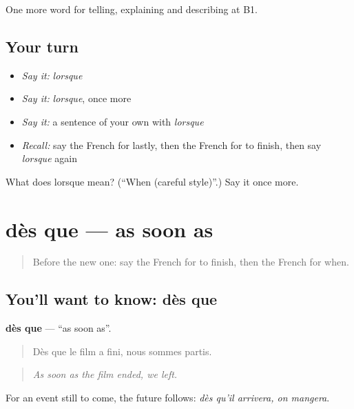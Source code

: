 \begin{grammarlens}[title={What you've built}]
One more word for telling, explaining and describing at B1.
\end{grammarlens}

\subsection*{Your turn}
\begin{itemize}
\raggedright
  \item \emph{Say it:} \emph{lorsque}
  \item \emph{Say it:} \emph{lorsque}, once more
  \item \emph{Say it:} a sentence of your own with \emph{lorsque}
  \item \emph{Recall:} say the French for lastly, then the French for to finish, then say \emph{lorsque} again
\end{itemize}

\begin{tcolorbox}[breakable,colback=teal!4,colframe=teal!35!black,title={Before you move on}]
What does lorsque mean? (\textquotedblleft{}When (careful style)\textquotedblright{}.) Say it once more.
\end{tcolorbox}
\section[dès que]{dès que — as soon as}

\label{lesson:FR-C269-des-que}



\begin{quote}
Before the new one: say the French for to finish, then the French for when.
\end{quote}

\subsection*{You'll want to know: dès que}
\textbf{dès que} — \textquotedblleft{}as soon as\textquotedblright{}.

\begin{quote}
Dès que le film a fini, nous sommes partis.
\end{quote}

\begin{quote}
\emph{As soon as the film ended, we left.}
\end{quote}

For an event still to come, the future follows: \emph{dès qu'il arrivera, on mangera}.

